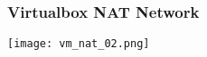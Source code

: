 \begin{frame}
\frametitle{Virtualbox NAT Network}
    \center\texttt{[image: vm\_nat\_02.png]}
\end{frame}
